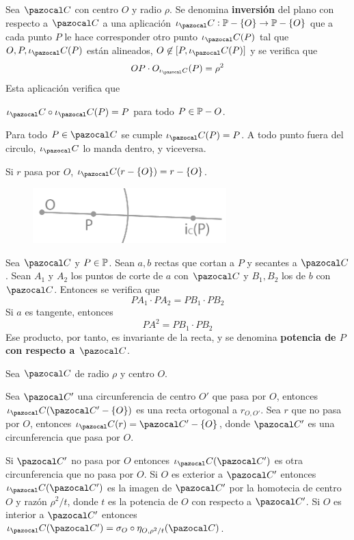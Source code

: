  Sea $\C$ con centro $O$ y radio $\rho$. Se denomina \textbf{inversión} del plano con respecto a $\C$ a una aplicación $\iota_\C: \P- \{O\}\rightarrow \P-\{O\}$ que a cada punto $P$ le hace corresponder otro punto $\iota_\C(P)$ tal que $O, P, \iota_\C(P)$ están alineados, $O\not\in [P, \iota_\C(P)]$ y se verifica que 
$$OP\cdot O_{\iota_\C}(P) = \rho^2$$
Esta aplicación verifica que 
\begin{itemizex}
	\item $\iota_\C\circ \iota_\C(P) = P$ para todo $P\in \P -{O}$.
	\item Para todo $P \in \C$ se cumple $\iota_\C(P) = P$. A todo punto fuera del circulo, $\iota_\C$ lo manda dentro, y viceversa.
	\item Si $r$ pasa por $O$, $\iota_\C(r-\{O\}) = r-\{O\}$.
\end{itemizex}
\begin{figure}[H]
	\centering
	\includegraphics[width=7.5cm]{figuras/8-15.png}
	\vspace{-1em}
\end{figure}
 Sea $\C$ y $P\in \P$. Sean $a, b$ rectas que cortan a $P$ y secantes a $\C$. Sean $A_1$ y $A_2$ los puntos de corte de $a$ con $\C$ y $B_1, B_2$ los de $b$ con $\C$. Entonces se verifica que 
\[PA_1\cdot PA_2 = PB_1 \cdot PB_2  \] 
Si $a$ es tangente, entonces 
\[PA^2 = PB_1 \cdot PB_2  \] 
Ese producto, por tanto, es invariante de la recta, y se denomina \textbf{potencia de $P$ con respecto a $\C$}.

 Sea $\C$ de radio $\rho$ y centro $O$.
\begin{itemizex}
	\item Sea $\C'$ una circunferencia de centro $O'$ que pasa por $O$, entonces $\iota_\C(\C'-\{O\})$ es una recta ortogonal a $r_{O,O'}$. Sea $r$ que no pasa por $O$, entonces $\iota_\C(r) = \C'-\{O\}$, donde $\C'$ es una circunferencia que pasa por $O$.
	\item Si $\C'$ no pasa por $O$ entonces $\iota_\C(\C')$ es otra circunferencia que no pasa por $O$. Si $O$ es exterior a $\C'$ entonces $\iota_\C(\C')$ es la imagen de $\C'$ por la homotecia de centro $O$ y razón $\rho^2/t$, donde $t$ es la potencia de $O$ con respecto a $\C'$. Si $O$ es interior a $\C'$ entonces $\iota_\C(\C') = \sigma_O \circ \eta_{O,\rho^2/t}(\C)$.
\end{itemizex}